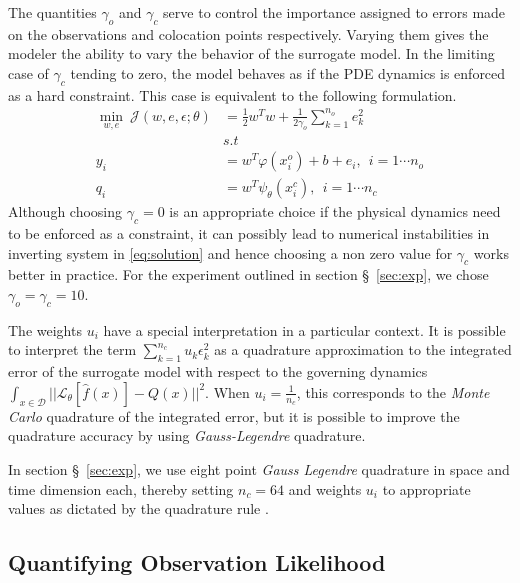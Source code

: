The quantities $\gamma_o$ and $\gamma_c$ serve to control the importance assigned to errors made 
on the observations and colocation points respectively. Varying them gives the modeler the ability 
to vary the behavior of the surrogate model. In the limiting case of $\gamma_c$ tending to zero, 
the model behaves as if the PDE dynamics is enforced as a hard constraint. This case is equivalent 
to the following formulation.
%
\begin{equation}\label{eq:surrogate2}
   \begin{aligned}
    \min_{w,e} \ \mathcal{J}(w,e,\epsilon;\theta) &= 
    \frac{1}{2} w^{T}w + \frac{1}{2\gamma_{o}} \sum_{k = 1}^{n_{o}}{e^{2}_{k}} \\
    & s.t \\
    y_{i} & = w^{T}\varphi(x^{o}_{i}) + b + e_{i}, \ \ i = 1 \cdots n_{o} \\
    q_{i} & = w^{T}\psi_{\theta}(x^{c}_{i}), \ \ i = 1 \cdots n_{c}
   \end{aligned}
\end{equation}
%
Although choosing $\gamma_c = 0$ is an appropriate choice if the physical dynamics need to be 
enforced as a constraint, it can possibly lead to numerical instabilities in inverting system in 
\cref{eq:solution} and hence choosing a non zero value for $\gamma_c$ works better in practice. For 
the experiment outlined in section \S~\ref{sec:exp}, we chose $\gamma_o = \gamma_c = 10$.

The weights $u_i$ have a special interpretation in a particular context. It is possible to
interpret the term $\sum_{k = 1}^{n_{c}}{u_{k} \epsilon^{2}_{k}}$ as a quadrature approximation
to the integrated error of the surrogate model with respect to the governing dynamics 
$\int_{x \in \mathcal{D}}{||\mathcal{L}_{\theta} [\hat{f}(x)] - Q(x)||^2}$. When 
$u_i = \frac{1}{n_c}$, this corresponds to the \emph{Monte Carlo} quadrature of the integrated 
error, but it is possible to improve the quadrature accuracy by using \emph{Gauss-Legendre} 
quadrature.

In section \S~\ref{sec:exp}, we use eight point \emph{Gauss Legendre} quadrature in space and time 
dimension each, thereby setting $n_c = 64$ and weights $u_i$ to appropriate values as dictated by 
the quadrature rule \citep{_abramowitzm}.

\subsection{Quantifying Observation Likelihood}

